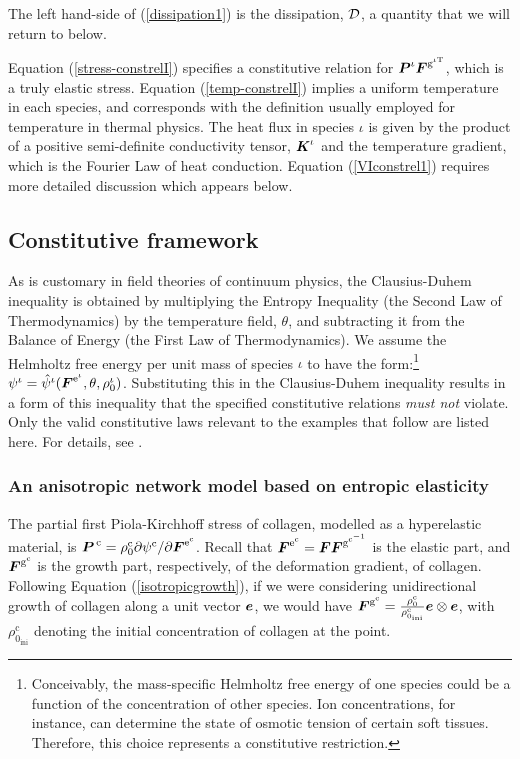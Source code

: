 \noindent The left hand-side of (\ref{dissipation1}) is the
dissipation, ${\mathcal D}$, a quantity that we will return to below.

Equation (\ref{stress-constrelI}) specifies a constitutive
relation for $\mbox{\boldmath$ P$}^\iota\mbox{\boldmath$ F$}^{\mathrm{g}^{\iota\mathrm{T}}}$, which
is a truly elastic stress. Equation (\ref{temp-constrelI}) implies
a uniform temperature in each species, and corresponds with the
definition usually employed for temperature in thermal physics.
The heat flux in species $\iota$ is given by the product of a
positive semi-definite conductivity tensor, ${\mbox{\boldmath$ K$}}^\iota$ and the
temperature gradient, which is the Fourier Law of heat conduction.
Equation (\ref{VIconstrel1}) requires more detailed discussion
which appears below.

\subsection{Constitutive framework}
\label{constitutive-framework}

As is customary in field theories of continuum physics, the
Clausius-Duhem inequality is obtained by multiplying the Entropy
Inequality (the Second Law of Thermodynamics) by the temperature
field, $\theta$, and subtracting it from the Balance of Energy (the
First Law of Thermodynamics). We assume the Helmholtz free energy per
unit mass of species $\iota$ to have the form:\footnote{Conceivably,
  the mass-specific Helmholtz free energy of one species could be a function of the
  concentration of other species. Ion concentrations, for instance,
  can determine the state of osmotic tension of certain soft
  tissues. Therefore, this choice represents a 
  constitutive restriction.}
$\psi^{\iota} = \hat{\psi}^\iota(\mbox{\boldmath$ F$}^{\mathrm{e}^\iota},
\theta, \rho_0^\iota)$.  Substituting this in the Clausius-Duhem
inequality results in a form of this inequality that the specified
constitutive relations \emph{must not} violate. Only the valid
constitutive laws relevant to the examples that follow are listed
here. For details, see \cite{growthpaper}.

\subsubsection{An anisotropic network model based on entropic
  elasticity}
\label{anisotropic-network-elasticity}

The partial first Piola-Kirchhoff stress of collagen, modelled as a
hyperelastic material, is $\mbox{\boldmath$ P$}^{\,\mathrm{c}} = \rho_0^\mathrm{c} \partial
\psi^\mathrm{c}/ \partial\mbox{\boldmath$ F$}^{\mathrm{e}^\mathrm{c}}$. Recall that
$\mbox{\boldmath$ F$}^{\mathrm{e}^\mathrm{c}} = \mbox{\boldmath$ F$}\mbox{\boldmath$ F$}^{\mathrm{g}^{\mathrm{c}^{-1}}}$
is the elastic part, and
$\mbox{\boldmath$ F$}^{\mathrm{g}^\mathrm{c}}$ 
is the growth part, respectively, of the deformation gradient, of
collagen. Following Equation 
(\ref{isotropicgrowth}), if we were considering unidirectional growth
of collagen along a unit vector $\mbox{\boldmath$ e$}$, we would have
$\mbox{\boldmath$ F$}^{\mathrm{g}^\mathrm{c}} = \frac{\rho^\mathrm{c}_{0}}
{\rho^\mathrm{c}_{0_{\mathrm{ini}}}} \mbox{\boldmath$ e$} \otimes \mbox{\boldmath$ e$}$, with
$\rho^\mathrm{c}_{0_{\mathrm{ini}}}$ denoting the initial
concentration of collagen at the point.

